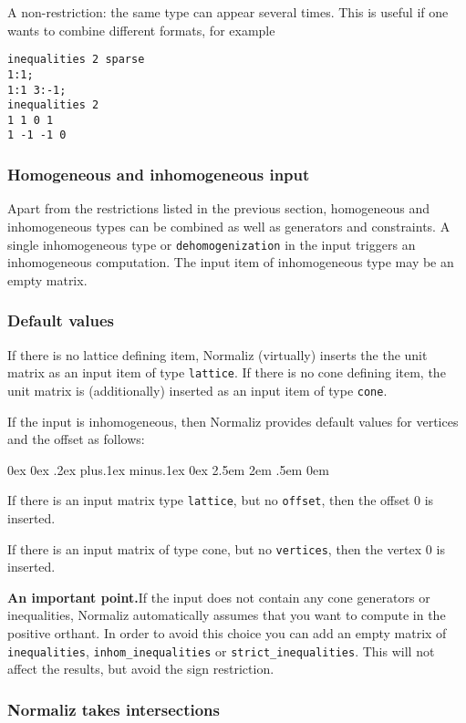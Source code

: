 \documentclass[12pt,a4paper]{scrartcl}
\newcounter{listi}
\newcommand{\stdli}{ \topsep0ex \partopsep0ex %
\parsep.2ex plus.1ex minus.1ex \itemsep0ex%
\leftmargin2.5em \labelwidth2em \labelsep.5em \rightmargin0em}%
\newenvironment{arab}{\begin{list}{\textup{(\arabic{listi})}}%
	{\usecounter{listi}\stdli}}{\end{list}}
\theoremstyle{definition}
\def\ttt{\texttt}
\begin{document}
A non-restriction: the same type can appear several times. This is useful if one wants to combine different formats, for example
\begin{Verbatim}
inequalities 2 sparse
1:1;
1:1 3:-1;
inequalities 2
1 1 0 1
1 -1 -1 0
\end{Verbatim}

\subsubsection{Homogeneous and inhomogeneous input}\label{inhom_inp}

Apart from the restrictions listed in the previous section, homogeneous and inhomogeneous types can be combined as well as generators and constraints. A single inhomogeneous type or \verb|dehomogenization| in the input triggers an inhomogeneous computation. The input item of inhomogeneous type may be an empty matrix.

\subsubsection{Default values}\label{default}

If there is no lattice defining item, Normaliz (virtually) inserts the the unit matrix as an input item of type \ttt{lattice}. If there is no cone defining item, the unit matrix is (additionally) inserted as an input item of type \ttt{cone}.

If the input is inhomogeneous, then Normaliz provides default values for vertices and the offset as follows:
\begin{arab}
	\item If there is an input matrix type \verb|lattice|, but no \ttt{offset}, then the offset $0$ is inserted.
	\item If there is an input matrix of type cone, but no \ttt{vertices}, then the vertex $0$ is inserted.
\end{arab}

\textbf{An important point.}\enspace If the input does not contain any cone generators or inequalities, Normaliz automatically assumes that you want to compute in the positive orthant. In order to avoid this choice you can add an empty matrix of \verb|inequalities|, \verb|inhom_inequalities| or \verb|strict_inequalities|. This will not affect the results, but avoid the sign restriction.



\subsubsection{Normaliz takes intersections}
\end{document}
